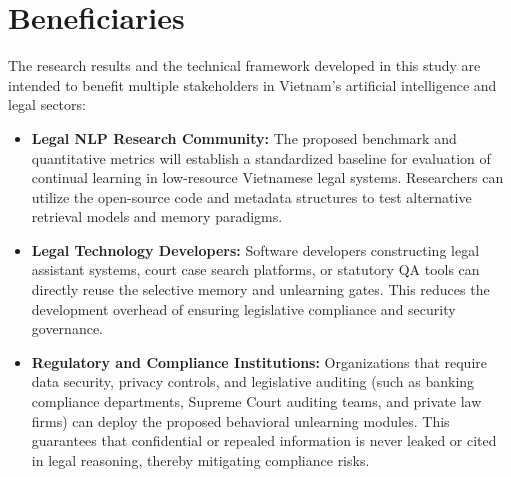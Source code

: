 \section{Beneficiaries}

The research results and the technical framework developed in this study are intended to benefit multiple stakeholders in Vietnam's artificial intelligence and legal sectors:

\begin{itemize}[leftmargin=*]
    \item \textbf{Legal NLP Research Community:} The proposed benchmark and quantitative metrics will establish a standardized baseline for evaluation of continual learning in low-resource Vietnamese legal systems. Researchers can utilize the open-source code and metadata structures to test alternative retrieval models and memory paradigms.
    \item \textbf{Legal Technology Developers:} Software developers constructing legal assistant systems, court case search platforms, or statutory QA tools can directly reuse the selective memory and unlearning gates. This reduces the development overhead of ensuring legislative compliance and security governance.
    \item \textbf{Regulatory and Compliance Institutions:} Organizations that require data security, privacy controls, and legislative auditing (such as banking compliance departments, Supreme Court auditing teams, and private law firms) can deploy the proposed behavioral unlearning modules. This guarantees that confidential or repealed information is never leaked or cited in legal reasoning, thereby mitigating compliance risks.
\end{itemize}
